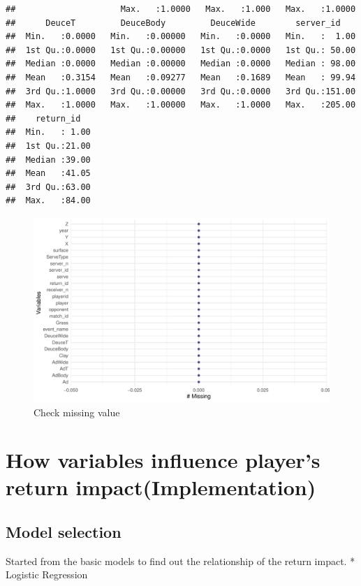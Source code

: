 \documentclass[11pt,a4paper,]{article}
\begin{document}
\begin{verbatim}
##                     Max.   :1.0000   Max.   :1.000   Max.   :1.0000  
##      DeuceT         DeuceBody         DeuceWide        server_id     
##  Min.   :0.0000   Min.   :0.00000   Min.   :0.0000   Min.   :  1.00  
##  1st Qu.:0.0000   1st Qu.:0.00000   1st Qu.:0.0000   1st Qu.: 50.00  
##  Median :0.0000   Median :0.00000   Median :0.0000   Median : 98.00  
##  Mean   :0.3154   Mean   :0.09277   Mean   :0.1689   Mean   : 99.94  
##  3rd Qu.:1.0000   3rd Qu.:0.00000   3rd Qu.:0.0000   3rd Qu.:151.00  
##  Max.   :1.0000   Max.   :1.00000   Max.   :1.0000   Max.   :205.00  
##    return_id    
##  Min.   : 1.00  
##  1st Qu.:21.00  
##  Median :39.00  
##  Mean   :41.05  
##  3rd Qu.:63.00  
##  Max.   :84.00
\end{verbatim}

\begin{figure}
\includegraphics[width=1\linewidth]{Report_files/figure-latex/tidymiss-1} \caption{Check missing value}\label{fig:tidymiss}
\end{figure}

\hypertarget{how-variables-influence-players-return-impactimplementation}{%
\section{How variables influence player's return impact(Implementation)}\label{how-variables-influence-players-return-impactimplementation}}

\hypertarget{model-selection}{%
\subsection{Model selection}\label{model-selection}}

Started from the basic models to find out the relationship of the return impact.
* Logistic Regression
\end{document}
